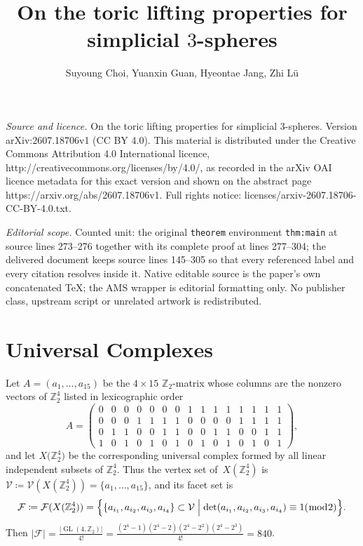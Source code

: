 \documentclass[10pt,a4paper]{amsart}
\newcommand{\Z}{\mathbb{Z}}
\newcommand{\cF}{\mathcal{F}}
\newcommand{\cV}{\mathcal{V}}
\DeclareMathOperator{\GL}{GL}
\begin{document}
\title[On the toric lifting properties for simplicial 3-spheres]{On the toric lifting properties for simplicial $3$-spheres}
\author{Suyoung Choi, Yuanxin Guan, Hyeontae Jang, Zhi Lü}
\date{}
\maketitle
\noindent\emph{Source and licence.} On the toric lifting properties for simplicial $3$-spheres. Version arXiv:2607.18706v1 (CC BY 4.0). This material is distributed under the Creative Commons Attribution 4.0 International licence, http://creativecommons.org/licenses/by/4.0/, as recorded in the arXiv OAI licence metadata for this exact version and shown on the abstract page https://arxiv.org/abs/2607.18706v1. Full rights notice: licenses/arxiv-2607.18706-CC-BY-4.0.txt.\par\smallskip
\noindent\textit{Editorial scope.} Counted unit: the original \texttt{theorem} environment \texttt{thm:main} at source lines 273--276 together with its complete proof at lines 277--304; the delivered document keeps source lines 145--305 so that every referenced label and every citation resolves inside it. Native editable source is the paper's own concatenated TeX; the AMS wrapper is editorial formatting only. No publisher class, upstream script or unrelated artwork is redistributed.
\section{Universal Complexes} \label{universal cpx}
Let $A=(a_1,\dots,a_{15})$ be the $4\times 15$ $\Z_2$-matrix whose columns are the nonzero vectors of $\Z_2^4$ listed in lexicographic order
$$
    A= \left(
    \begin{array}{ccccccccccccccc}
        0&0&0&0&0&0&0&1&1&1&1&1&1&1&1\\
        0&0&0&1&1&1&1&0&0&0&0&1&1&1&1\\
        0&1&1&0&0&1&1&0&0&1&1&0&0&1&1\\
        1&0&1&0&1&0&1&0&1&0&1&0&1&0&1
    \end{array} \right),
$$
and let $X\bigl(\Z_2^4\bigr)$ be the corresponding universal complex formed by all linear independent subsets of $\Z_2^4$.
Thus the vertex set of~$X(\Z_2^4)$ is $\cV\coloneq\cV(X(\Z_2^4)) = \{a_1,\dots,a_{15}\}$, and its facet set is
$$
    \cF\coloneq\cF(X(\Z_2^4)) =\Bigl\{ \{a_{i_1},a_{i_2},a_{i_3},a_{i_4}\}\subset \cV \Bigm| \det(a_{i_1},a_{i_2},a_{i_3},a_{i_4})\equiv 1 (\bmod 2) \Bigr\}.
$$
Then $|\cF|=\frac{|\GL(4,\Z_2)|}{4!}=\frac{(2^4-1)(2^4-2)(2^4-2^2)(2^4-2^3)}{4!}=840$.
\end{document}
